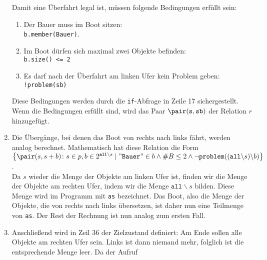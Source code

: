 \begin{enumerate}
      Damit eine Überfahrt legal ist, m\"ussen folgende Bedingungen erf\"ullt sein:
      \begin{enumerate}
      \item Der Bauer muss im Boot sitzen: 
            \\[0.2cm]
            \hspace*{1.3cm}
            \texttt{b.member(Bauer)}.
      \item Im Boot d\"urfen sich maximal zwei Objekte befinden:
            \\[0.2cm]
            \hspace*{1.3cm}
            \texttt{b.size() <= 2}
      \item Es darf nach der Überfahrt am linken Ufer kein Problem geben:
            \\[0.2cm]
            \hspace*{1.3cm}
            \texttt{!problem(sb)}
      \end{enumerate}
      Diese Bedingungen werden durch die \texttt{if}-Abfrage in Zeile 17 sichergestellt.
      Wenn die Bedingungen erf\"ullt sind, wird das Paar $\pair(\mathtt{s}, \mathtt{sb})$
      der Relation $r$ hinzugef\"ugt.
\item Die Überg\"ange, bei denen das Boot von rechts nach links f\"ahrt, werden analog
      berechnet.  Mathematisch hat diese Relation die Form
      \\[0.2cm]
      \hspace*{1.3cm}
      $\bigl\{ \pair(s, s + b) \colon s \in p, b \in 2^{\mathtt{all} \backslash s} \mid
              \mathtt{\symbol{34}Bauer\symbol{34}} \in b \wedge \#B \leq 2 \wedge \neg
              \mathtt{problem}((\mathtt{all} \backslash s) \backslash b) 
       \bigr\}
      $.
      \\[0.2cm]
      Da $s$ wieder die Menge der Objekte am linken Ufer ist, finden wir die Menge der Objekte
      am rechten Ufer, indem wir die Menge $\mathtt{all} \backslash s$ bilden.  Diese
      Menge wird im Programm mit \texttt{as} bezeichnet.  Das Boot, also die Menge der
      Objekte, die von rechts nach links \"ubersetzen, ist daher nun eine Teilmenge von \texttt{as}.
      Der Rest der Rechnung ist nun analog zum ersten Fall.
\item Anschlie\ss{}end wird in Zeil 36 der Zielzustand definiert:
      Am Ende sollen alle Objekte am rechten Ufer sein.  Links ist dann niemand mehr,
      folglich ist die entsprechende Menge leer.  Da der Aufruf
      \\[0.2cm]

\end{enumerate}
